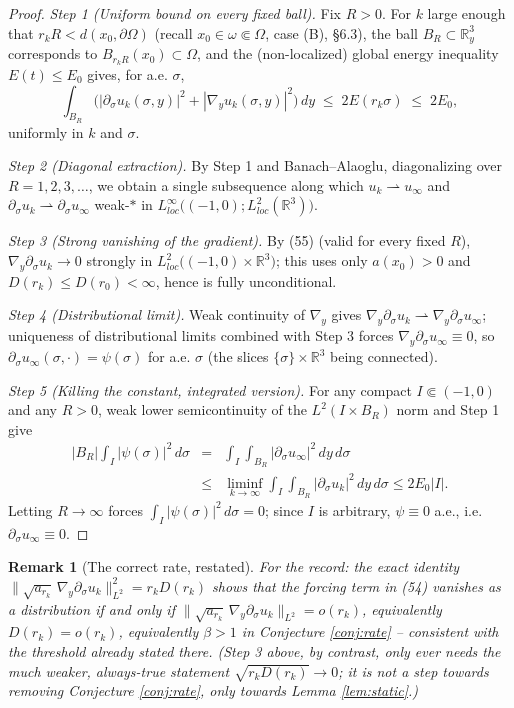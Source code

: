 \documentclass[11pt,letterpaper]{amsart}
\newtheorem{remark}[theorem]{Remark}
\begin{document}
\begin{proof}
\emph{Step 1 (Uniform bound on every fixed ball).} Fix $R>0$. For $k$
large enough that $r_kR<d(x_0,\partial\Omega)$ (recall $x_0\in\omega
\Subset\Omega$, case (B), \S6.3), the ball $B_R\subset\mathbb R^3_y$
corresponds to $B_{r_kR}(x_0)\subset\Omega$, and the (non-localized)
global energy inequality $E(t)\le E_0$ gives, for a.e. $\sigma$,
\[
\int_{B_R}\big(|\partial_\sigma u_k(\sigma,y)|^2+|\nabla_yu_k(\sigma,y)|^2\big)\,dy
\;\le\;2E(r_k\sigma)\;\le\;2E_0,
\]
uniformly in $k$ and $\sigma$.

\emph{Step 2 (Diagonal extraction).} By Step 1 and Banach--Alaoglu,
diagonalizing over $R=1,2,3,\dots$, we obtain a single subsequence along
which $u_k\rightharpoonup u_\infty$ and $\partial_\sigma u_k
\rightharpoonup\partial_\sigma u_\infty$ weak-$*$ in
$L^\infty_{loc}\big((-1,0);L^2_{loc}(\mathbb R^3)\big)$.

\emph{Step 3 (Strong vanishing of the gradient).} By (55) (valid for
every fixed $R$), $\nabla_y\partial_\sigma u_k\to0$ strongly in
$L^2_{loc}\big((-1,0)\times\mathbb R^3\big)$; this uses only $a(x_0)>0$
and $D(r_k)\le D(r_0)<\infty$, hence is fully unconditional.

\emph{Step 4 (Distributional limit).} Weak continuity of $\nabla_y$
gives $\nabla_y\partial_\sigma u_k\rightharpoonup\nabla_y\partial_\sigma
u_\infty$; uniqueness of distributional limits combined with Step 3
forces $\nabla_y\partial_\sigma u_\infty\equiv0$, so
$\partial_\sigma u_\infty(\sigma,\cdot)=\psi(\sigma)$ for a.e. $\sigma$
(the slices $\{\sigma\}\times\mathbb R^3$ being connected).

\emph{Step 5 (Killing the constant, integrated version).} For any
compact $I\Subset(-1,0)$ and any $R>0$, weak lower semicontinuity of the
$L^2(I\times B_R)$ norm and Step 1 give
\begin{eqnarray*}
|B_R|\int_I|\psi(\sigma)|^2\,d\sigma
&=&\int_I\int_{B_R}|\partial_\sigma u_\infty|^2\,dy\,d\sigma\\
&\le&\liminf_{k\to\infty}\int_I\int_{B_R}|\partial_\sigma u_k|^2\,dy\,d\sigma
\le 2E_0|I|.
\end{eqnarray*}
Letting $R\to\infty$ forces $\int_I|\psi(\sigma)|^2\,d\sigma=0$; since
$I$ is arbitrary, $\psi\equiv0$ a.e., i.e. $\partial_\sigma u_\infty
\equiv0$.
\end{proof}

\begin{remark}[The correct rate, restated]
\label{rem:rate}
For the record: the exact identity $\|\sqrt{a_{r_k}}\,\nabla_y\partial_\sigma
u_k\|_{L^2}^2=r_kD(r_k)$ shows that the forcing term in (54) vanishes as
a distribution if and only if $\|\sqrt{a_{r_k}}\,\nabla_y\partial_\sigma
u_k\|_{L^2}=o(r_k)$, equivalently $D(r_k)=o(r_k)$, equivalently
$\beta>1$ in Conjecture \ref{conj:rate} -- consistent with the threshold already
stated there. (Step 3 above, by contrast, only ever needs the much
weaker, always-true statement $\sqrt{r_kD(r_k)}\to0$; it is not a step
towards removing Conjecture \ref{conj:rate}, only towards Lemma \ref{lem:static}.)
\end{remark}
\end{document}
